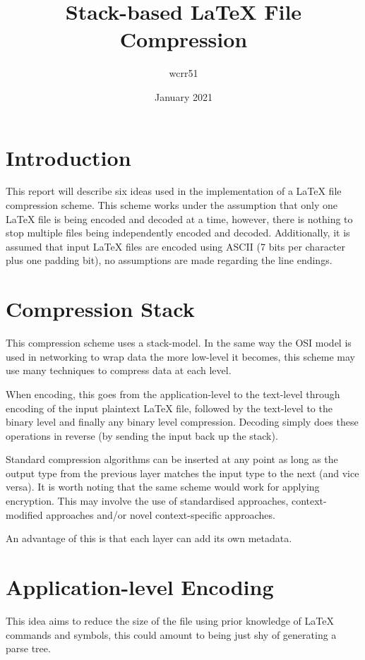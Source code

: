 \documentclass[11pt]{article}
\title{Stack-based \LaTeX{} File Compression}
\author{wcrr51}
\date{January 2021}
\begin{document}
    \maketitle

    \begin{multicols*}{2}

        \section{Introduction}\label{sec:introduction}
        This report will describe six ideas used in the implementation of a \LaTeX{} file compression scheme.
        This scheme works under the assumption that only one \LaTeX{} file is being encoded and decoded at a time, however, there is nothing to stop multiple files being independently encoded and decoded.
        Additionally, it is assumed that input \LaTeX{} files are encoded using ASCII (7 bits per character plus one padding bit), no assumptions are made regarding the line endings.


        \section{Compression Stack}\label{sec:compression-stack}
        This compression scheme uses a stack-model.
        In the same way the OSI model is used in networking to wrap data the more low-level it becomes, this scheme may use many techniques to compress data at each level.

        When encoding, this goes from the application-level to the text-level through encoding of the input plaintext \LaTeX{} file, followed by the text-level to the binary level and finally any binary level compression.
        Decoding simply does these operations in reverse (by sending the input back up the stack).

        Standard compression algorithms can be inserted at any point as long as the output type from the previous layer matches the input type to the next (and vice versa).
        It is worth noting that the same scheme would work for applying encryption.
        This may involve the use of standardised approaches, context-modified approaches and/or novel context-specific approaches.

        An advantage of this is that each layer can add its own metadata.


        \section{Application-level Encoding}\label{sec:application-level-encoding}
        This idea aims to reduce the size of the file using prior knowledge of \LaTeX{} commands and symbols, this could amount to being just shy of generating a parse tree.


\end{multicols*}
\end{document}
